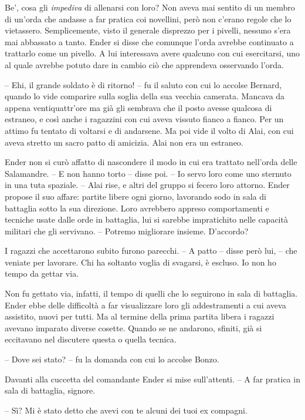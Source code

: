 {Be', cosa gli \emph{impediva} di allenarsi con loro? Non aveva mai
	sentito di un membro di un'orda che andasse a far pratica coi novellini,
	però non c'erano regole che lo vietassero. Semplicemente, visto il
	generale disprezzo per i pivelli, nessuno s'era mai abbassato a tanto.
	Ender si disse che comunque l'orda avrebbe continuato a trattarlo come
	un pivello. A lui interessava avere qualcuno con cui esercitarsi, uno al
	quale avrebbe potuto dare in cambio ciò che apprendeva osservando
	l'orda.}

{-- Ehi, il grande soldato è di ritorno! -- fu il saluto con cui lo
	accolse Bernard, quando lo vide comparire sulla soglia della sua vecchia
	camerata. Mancava da appena ventiquattr'ore ma già gli sembrava che il
	posto avesse qualcosa di estraneo, e così anche i ragazzini con cui
	aveva vissuto fianco a fianco. Per un attimo fu tentato di voltarsi e di
	andarsene. Ma poi vide il volto di Alai, con cui aveva stretto un sacro
	patto di amicizia. Alai non era un estraneo.}

{Ender non si curò affatto di nascondere il modo in cui era trattato
	nell'orda delle Salamandre. -- E non hanno torto -- disse poi. -- Io
	servo loro come uno sternuto in una tuta spaziale. -- Alai rise, e altri
	del gruppo si fecero loro attorno. Ender propose il suo affare: partite
	libere ogni giorno, lavorando sodo in sala di battaglia sotto la sua
	direzione. Loro avrebbero appreso comportamenti e tecniche usate dalle
	orde in battaglia, lui si sarebbe impratichito nelle capacità militari
	che gli servivano. -- Potremo migliorare insieme. D'accordo?}

{I ragazzi che accettarono subito furono parecchi. -- A patto -- disse
	però lui, -- che veniate per lavorare. Chi ha soltanto voglia di
	svagarsi, è escluso. Io non ho tempo da gettar via.}

{Non fu gettato via, infatti, il tempo di quelli che lo seguirono in
	sala di battaglia. Ender ebbe delle difficoltà a far visualizzare loro
	gli addestramenti a cui aveva assistito, nuovi per tutti. Ma al termine
	della prima partita libera i ragazzi avevano imparato diverse cosette.
	Quando se ne andarono, sfiniti, già si eccitavano nel discutere questa o
	quella tecnica.}

{-- Dove sei stato? -- fu la domanda con cui lo accolse Bonzo.}

{Davanti alla cuccetta del comandante Ender si mise sull'attenti. -- A
	far pratica in sala di battaglia, signore.}

{-- Sì? Mi è stato detto che avevi con te alcuni dei tuoi ex compagni.}

